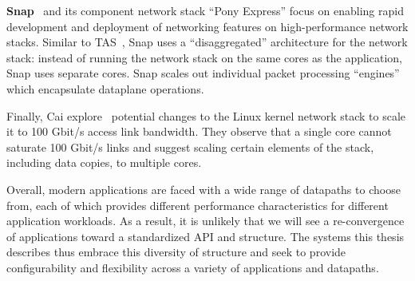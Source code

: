 \textbf{Snap}~\cite{snap} and its component network stack ``Pony Express'' focus on enabling rapid development and deployment of networking features on high-performance network stacks. Similar to TAS~\cite{tas}, Snap uses a ``disaggregated'' architecture for the network stack: instead of running the network stack on the same cores as the application, Snap uses separate cores. Snap scales out individual packet processing ``engines'' which encapsulate dataplane operations.

Finally, Cai \etal explore~\cite{host-net-overheads} potential changes to the Linux kernel network stack to scale it to 100 Gbit/s access link bandwidth. They observe that a single core cannot saturate 100 Gbit/s links and suggest scaling certain elements of the stack, including data copies, to multiple cores.

Overall, modern applications are faced with a wide range of datapaths to choose from, each of which provides different performance characteristics for different application workloads. As a result, it is unlikely that we will see a re-convergence of applications toward a standardized API and structure. The systems this thesis describes thus embrace this diversity of structure and seek to provide configurability and flexibility across a variety of applications and datapaths.
